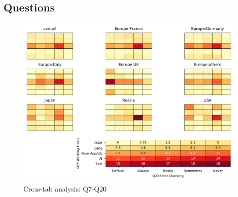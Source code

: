 
\subsection{Questions}


\begin{figure}
\begin{center}
\includegraphics[width=12cm]{../pdfs/Q7-Q20.pdf}
\caption{Cross-tab analysis: Q7-Q20}
\label{fig:Q7-Q20}
\end{center}
\end{figure}
